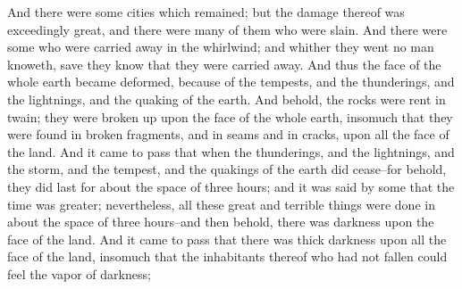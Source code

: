 \bverse \iffalse And there were some cities which remained; but the damage thereof was exceedingly great, and there were many of them who were slain. \fi
And there were some cities which remained; but the damage thereof was exceedingly great, and there were many of them who were slain.
\bverse \iffalse And there were some who were carried away in the whirlwind; and whither they went no man knoweth, save they know that they were carried away. \fi
And there were some who were carried away in the whirlwind; and whither they went no man knoweth, save they know that they were carried away.
\bverse \iffalse And thus the face of the whole earth became deformed, because of the tempests, and the thunderings, and the lightnings, and the quaking of the earth. \fi
And thus the face of the whole earth became deformed, because of the tempests, and the thunderings, and the lightnings, and the quaking of the earth.
\bverse \iffalse And behold, the rocks were rent in twain; they were broken up upon the face of the whole earth, insomuch that they were found in broken fragments, and in seams and in cracks, upon all the face of the land. \fi
And behold, the rocks were rent in twain; they were broken up upon the face of the whole earth, insomuch that they were found in broken fragments, and in seams and in cracks, upon all the face of the land.
\bverse \iffalse And it came to pass that when the thunderings, and the lightnings, and the storm, and the tempest, and the quakings of the earth did cease--for behold, they did last for about the space of three hours; and it was said by some that the time was greater; nevertheless, all these great and terrible things were done in about the space of three hours--and then behold, there was darkness upon the face of the land. \fi
And it came to pass that when the thunderings, and the lightnings, and the storm, and the tempest, and the quakings of the earth did cease--for behold, they did last for about the space of three hours; and it was said by some that the time was greater; nevertheless, all these great and terrible things were done in about the space of three hours--and then behold, there was darkness upon the face of the land.
\bverse \iffalse And it came to pass that there was thick darkness upon all the face of the land, insomuch that the inhabitants thereof who had not fallen could feel the vapor of darkness; \fi
And it came to pass that there was thick darkness upon all the face of the land, insomuch that the inhabitants thereof who had not fallen could feel the vapor of darkness;
